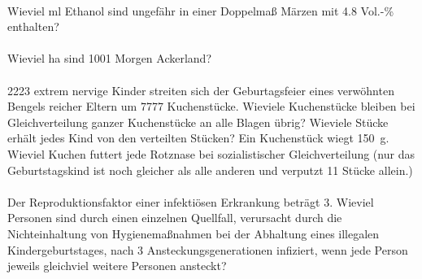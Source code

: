 \documentclass[paper=A4, pagesize, DIV=calc, smallheadings,
fontsize=12pt, expansion=false]{scrreprt}
\begin{document}
\paragraph{}
Wieviel ml Ethanol sind ungefähr in einer Doppelmaß Märzen mit \num{4.8} Vol.-\%  enthalten?

\paragraph{}
Wieviel ha sind 1001 Morgen Ackerland?

\paragraph{}
2223 extrem nervige Kinder streiten sich der Geburtagsfeier eines verwöhnten Bengels reicher Eltern um 7777 
Kuchenstücke. 
Wieviele Kuchenstücke bleiben bei Gleichverteilung ganzer Kuchenstücke an alle Blagen übrig? 
Wieviele Stücke erhält jedes Kind von den verteilten Stücken? Ein Kuchenstück wiegt \SI{150}{g}. Wieviel Kuchen futtert 
jede Rotznase bei 
sozialistischer Gleichverteilung (nur das Geburtstagskind ist noch gleicher als alle anderen und verputzt 11 Stücke 
allein.)

\paragraph{}
Der Reproduktionsfaktor einer infektiösen Erkrankung beträgt 3. Wieviel Personen sind durch einen einzelnen Quellfall,
verursacht durch die Nichteinhaltung von Hygienemaßnahmen bei der Abhaltung eines illegalen Kindergeburtstages, 
nach 3 Ansteckungsgenerationen infiziert, wenn jede Person jeweils gleichviel weitere Personen ansteckt?
\end{document}
